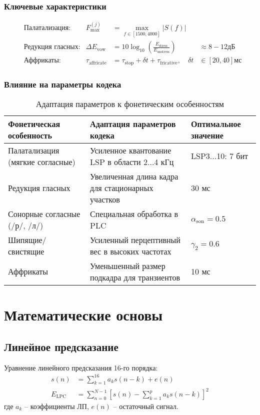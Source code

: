 \documentclass{report}
\begin{document}
	\subsection{Ключевые характеристики}
	\begin{align}
		&\text{Палатализация:} & F_{\text{max}}^{(j)} &= \max_{f \in [1500,4000]} |S(f)| \\
		&\text{Редукция гласных:} & \Delta E_{\text{vow}} &= 10 \log_{10} \left( \frac{E_{\text{stress}}}{E_{\text{unstress}}} \right) &\approx 8-12 \text{дБ} \\
		&\text{Аффрикаты:} & \tau_{\text{affricate}} &= \tau_{\text{stop}} + \delta t + \tau_{\text{fricative}}, \quad \delta t &\in [20,40] \text{мс}
	\end{align}
	
	\subsection{Влияние на параметры кодека}
	\begin{table}[H]
		\centering
		\caption{Адаптация параметров к фонетическим особенностям}
		\begin{tabular}{p{4cm}p{6cm}p{3cm}}
			\toprule
			\textbf{Фонетическая особенность} & \textbf{Адаптация параметров кодека} & \textbf{Оптимальное значение} \\
			\midrule
			Палатализация (мягкие согласные) & Усиленное квантование LSP в области 2$\ldots$4 кГц & LSP3$\ldots$10: 7 бит \\
			Редукция гласных & Увеличенная длина кадра для стационарных участков & 30 мс \\
			Сонорные согласные (/р/, /л/) & Специальная обработка в PLC & $\alpha_{\text{son}} = 0.5$ \\
			Шипящие/свистящие & Усиленный перцептивный вес в высоких частотах & $\gamma_2 = 0.6$ \\
			Аффрикаты & Уменьшенный размер подкадра для транзиентов & 10 мс \\
			\bottomrule
		\end{tabular}
	\end{table}
	
	\chapter{Математические основы}
	\section{Линейное предсказание}
	Уравнение линейного предсказания 16-го порядка:
	\begin{align}
		s(n) &= \sum_{k=1}^{16} a_k s(n-k) + e(n) \\
		E_{\text{LPC}} &= \sum_{n=0}^{N-1} \left[ s(n) - \sum_{k=1}^{p} a_k s(n-k) \right]^2
	\end{align}
	где $a_k$ -- коэффициенты ЛП, $e(n)$ -- остаточный сигнал.
	
\end{document}
